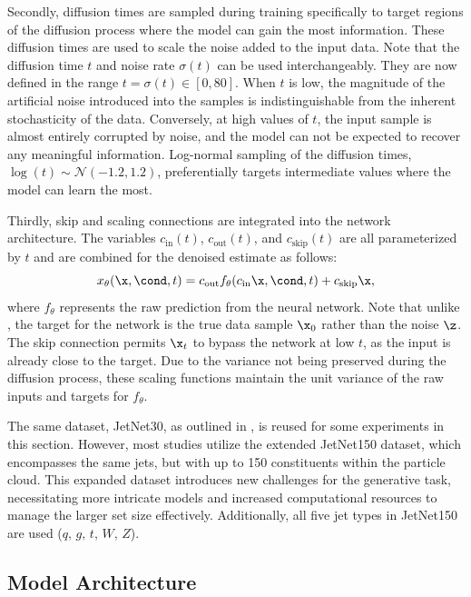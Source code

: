 Secondly, diffusion times are sampled during training specifically to target regions of the diffusion process where the model can gain the most information.
These diffusion times are used to scale the noise added to the input data.
Note that the diffusion time $t$ and noise rate $\sigma(t)$ can be used interchangeably.
They are now defined in the range $t = \sigma(t) \in [0, 80]$.
When $t$ is low, the magnitude of the artificial noise introduced into the samples is indistinguishable from the inherent stochasticity of the data.
Conversely, at high values of $t$, the input sample is almost entirely corrupted by noise, and the model can not be expected to recover any meaningful information.
Log-normal sampling of the diffusion times, ${\log(t)\sim\mathcal{N}\left(-1.2, 1.2\right)}$, preferentially targets intermediate values where the model can learn the most.

Thirdly, skip and scaling connections are integrated into the network architecture.
The variables $c_\mathrm{in}(t)$, $c_\mathrm{out}(t)$, and $c_\mathrm{skip}(t)$ are all parameterized by $t$ and are combined for the denoised estimate as follows:
\begin{equation}
    x_\theta(\x, \cond, t) = c_\mathrm{out} f_\theta(c_\mathrm{in}\x, \cond, t) + c_\mathrm{skip}\x,
\end{equation}
where $f_\theta$ represents the raw prediction from the neural network.
Note that unlike \pcjedi, the target for the network is the true data sample $\x_0$ rather than the noise $\z$.
The skip connection permits $\x_t$ to bypass the network at low $t$, as the input is already close to the target.
Due to the variance not being preserved during the diffusion process, these scaling functions maintain the unit variance of the raw inputs and targets
for $f_\theta$.

The same dataset, JetNet30, as outlined in , is reused for some experiments in this section.
However, most studies utilize the extended JetNet150 dataset, which encompasses the same jets, but with up to 150 constituents within the particle cloud.
This expanded dataset introduces new challenges for the generative task, necessitating more intricate models and increased computational resources to manage the larger set size effectively.
Additionally, all five jet types in JetNet150 are used ($q,\,g,\,t,\,W,\,Z$).

\subsection{Model Architecture}


